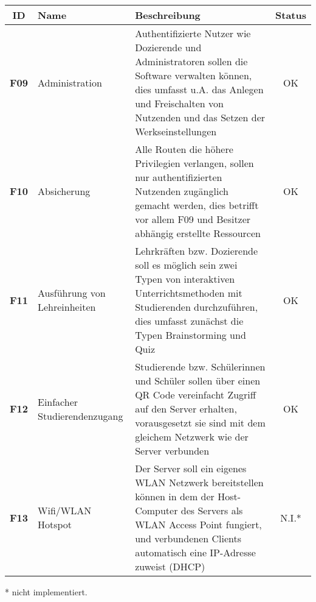 \begin{table}[h!]
	\small
	\begin{tabularx}{\textwidth}{clXc}
		\toprule
		\textbf{ID} & \textbf{Name} & \textbf{Beschreibung}                                                                                                                                                                                                                                                                 & \textbf{Status} \\ \midrule
		\textbf{F09}         & Administration                                            & Authentifizierte Nutzer wie Dozierende und Administratoren sollen die Software verwalten können, dies umfasst u.A. das Anlegen und Freischalten von Nutzenden und das Setzen der Werkseinstellungen                                                                            & OK              \\
		\rowcolor[HTML]{EFEFEF}
		\textbf{F10}         & Absicherung                                               & Alle Routen die höhere Privilegien verlangen, sollen nur authentifizierten Nutzenden zugänglich gemacht werden, dies betrifft vor allem F09 und Besitzer abhängig erstellte Ressourcen                                                                                                & OK              \\
		\rowcolor[HTML]{FFFFFF}
		\textbf{F11}         & Ausführung von Lehreinheiten                              & Lehrkräften bzw. Dozierende soll es möglich sein zwei Typen von interaktiven Unterrichtsmethoden mit Studierenden durchzuführen, dies umfasst zunächst die Typen Brainstorming und Quiz                                                                                          & OK              \\
		\rowcolor[HTML]{EFEFEF}
		\textbf{F12}         & Einfacher Studierendenzugang                              & Studierende bzw. Schülerinnen und Schüler sollen über einen QR Code vereinfacht Zugriff auf den Server erhalten, vorausgesetzt sie sind mit dem gleichem Netzwerk wie der Server verbunden                                                                                     & OK              \\
		\rowcolor[HTML]{FFFFFF}
		\textbf{F13}         & Wifi/WLAN Hotspot                                         & Der Server soll ein eigenes WLAN Netzwerk bereitstellen können in dem der Host-Computer des Servers als WLAN Access Point fungiert, und verbundenen Clients automatisch eine IP-Adresse zuweist (DHCP)                                                                             & N.I.*        \\ \bottomrule
		
	\end{tabularx}

\end{table}

* nicht implementiert.


\normalsize

